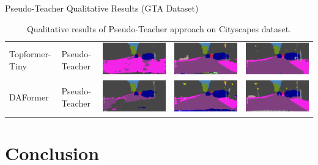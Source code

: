 \documentclass{lib/curtin_format}
\begin{document}
\begin{frame}{Pseudo-Teacher Qualitative Results (GTA Dataset)}
\begin{table}[hb]
{\begin{tabular}{lllll}
                Topformer-Tiny & Pseudo-Teacher    & \includegraphics[width=.2\linewidth]{res/pseudo-teacher-qualitative/topformer-tiny-sourceonly.png} & \includegraphics[width=.2\linewidth]{res/pseudo-teacher-qualitative/topformer-tiny-pseudo-teacher.png} & \includegraphics[width=.2\linewidth]{res/pseudo-teacher-qualitative/topformer-tiny-oracle.png} \\
                DAFormer       & Pseudo-Teacher    & \includegraphics[width=.2\linewidth]{res/pseudo-teacher-qualitative/daformer-sourceonly.png}       & \includegraphics[width=.2\linewidth]{res/pseudo-teacher-qualitative/daformer-uda.png}                  & \includegraphics[width=.2\linewidth]{res/pseudo-teacher-qualitative/daformer-oracle.png}       \\
            \end{tabular}
        }
        \caption{Qualitative results of Pseudo-Teacher approach on Cityscapes dataset.}
        \label{fig:pseudo-teacher-qualitative}
    \end{table}
\end{frame}

\section{Conclusion}


\end{document}
